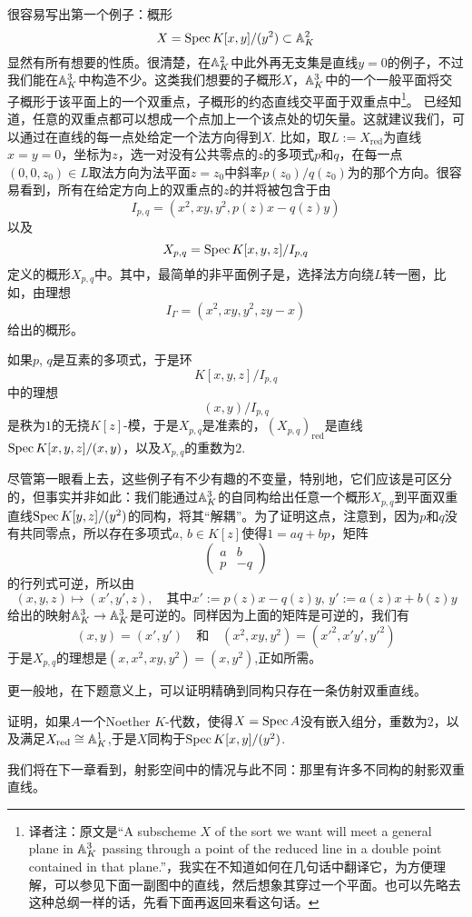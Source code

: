 很容易写出第一个例子：概形
\[
	X=\operatorname{Spec} K[x,y]/(y^2)\subset \mathbb{A}_K^2
\]
显然有所有想要的性质。很清楚，在$\mathbb{A}_K^2$中此外再无支集是直线$y=0$的例子，不过我们能在$\mathbb{A}_K^3$中构造不少。这类我们想要的子概形$X$，$\mathbb{A}_{K}^3$中的一个一般平面将交子概形于该平面上的一个双重点，子概形的约态直线交平面于双重点中\footnote{译者注：原文是``A subscheme $X$ of the sort we want will meet a general plane in $\mathbb{A}_K^3$ passing through a point of the reduced line in a double point contained in that plane.''，我实在不知道如何在几句话中翻译它，为方便理解，可以参见下面一副图中的直线，然后想象其穿过一个平面。也可以先略去这种总纲一样的话，先看下面再返回来看这句话。}。
已经知道，任意的双重点都可以想成一个点加上一个该点处的切矢量。这就建议我们，可以通过在直线的每一点处给定一个法方向得到$X$. 比如，取$L:=X_{\text{red}}$为直线$x=y=0$，坐标为$z$，选一对没有公共零点的$z$的多项式$p$和$q$，在每一点$(0,0,z_0)\in L$取法方向为法平面$z=z_0$中斜率$p(z_0)/q(z_0)$为的那个方向。很容易看到，所有在给定方向上的双重点的$z$的并将被包含于由
\[
	I_{p,q}=(x^2,xy,y^2,p(z)x-q(z)y)
\]
以及
\[
	X_{p,q}=\operatorname{Spec} K[x,y,z]/I_{p,q}
\]
定义的概形$X_{p,q}$中。其中，最简单的非平面例子是，选择法方向绕$L$转一圈，比如，由理想
\[
	I_\Gamma=(x^2,xy,y^2,zy-x)
\]
给出的概形。


\begin{exe}
如果$p$, $q$是互素的多项式，于是环
\[
	K[x,y,z]/I_{p,q}
\]
中的理想
\[
	(x,y)/I_{p,q}
\]
是秩为$1$的无挠$K[z]$\hyp 模，于是$X_{p,q}$是准素的，$(X_{p,q})_{\text{red}}$是直线$\operatorname{Spec} K[x,y,z]/(x,y)$，以及$X_{p,q}$的重数为$2$.
\end{exe}

尽管第一眼看上去，这些例子有不少有趣的不变量，特别地，它们应该是可区分的，但事实并非如此：我们能通过$\mathbb{A}_{K}^3$的自同构给出任意一个概形$X_{p,q}$到平面双重直线$\operatorname{Spec} K[y,z]/(y^2)$的同构，将其“解耦”。为了证明这点，注意到，因为$p$和$q$没有共同零点，所以存在多项式$a$, $b\in K[z]$使得$1=aq+bp$，矩阵
\[
	\begin{pmatrix}
	a&b\\
	p&-q
	\end{pmatrix}
\]
的行列式可逆，所以由
\[
	(x,y,z)\mapsto (x',y',z),\quad \text{其中$x':=p(z)x-q(z)y$, $y':=a(z)x+b(z)y$}
\]
给出的映射$\mathbb{A}_K^3\to \mathbb{A}_K^3$是可逆的。同样因为上面的矩阵是可逆的，我们有
\[
	(x,y)=(x',y')\quad\text{和}\quad (x^2,xy,y^2)=({x'}^2,x'y',{y'}^2)
\]
于是$X_{p,q}$的理想是$(x,x^2,xy,y^2)=(x,y^2)$,正如所需。

更一般地，在下题意义上，可以证明精确到同构只存在一条仿射双重直线。

\begin{exe}
	证明，如果$A$一个Noether $K$\hyp 代数，使得$X=\operatorname{Spec} A$没有嵌入组分，重数为$2$，以及满足$X_{\text{red}}\cong \mathbb{A}_K^1$,于是$X$同构于$\operatorname{Spec} K[x,y]/(y^2)$.
\end{exe}

我们将在下一章看到，射影空间中的情况与此不同：那里有许多不同构的射影双重直线。